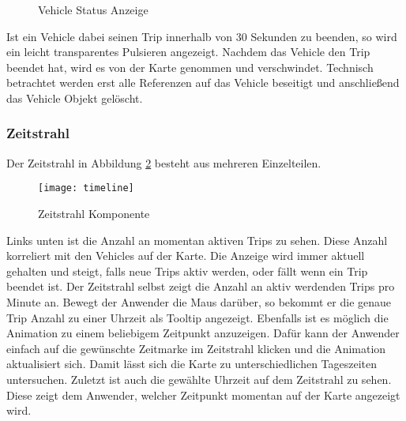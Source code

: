       \begin{figure}[htbp]
        \centering
        \hfill
        \caption{Vehicle Status Anzeige}
        \label{fig:vehicle_states}
      \end{figure}

      
      Ist ein Vehicle dabei seinen Trip innerhalb von 30 Sekunden zu beenden, so wird ein leicht transparentes Pulsieren angezeigt. Nachdem das Vehicle den Trip beendet hat, wird es von der Karte genommen und verschwindet. Technisch betrachtet werden erst alle Referenzen auf das Vehicle beseitigt und anschließend das Vehicle Objekt gelöscht.
      

    \subsubsection*{Zeitstrahl}
    \label{ssub:zeitstrahl}
      Der Zeitstrahl in Abbildung \ref{fig:timeline} besteht aus mehreren Einzelteilen. 

      \begin{figure}[htbp]
        \begin{center}
          \texttt{[image: timeline]}
          \caption{Zeitstrahl Komponente}
          \label{fig:timeline}
        \end{center}
      \end{figure}

      Links unten ist die Anzahl an momentan aktiven Trips zu sehen. Diese Anzahl korreliert mit den Vehicles auf der Karte. Die Anzeige wird immer aktuell gehalten und steigt, falls neue Trips aktiv werden, oder fällt wenn ein Trip beendet ist. Der Zeitstrahl selbst zeigt die Anzahl an aktiv werdenden Trips pro Minute an. Bewegt der Anwender die Maus darüber, so bekommt er die genaue Trip Anzahl zu einer Uhrzeit als Tooltip angezeigt. Ebenfalls ist es möglich die Animation zu einem beliebigem Zeitpunkt anzuzeigen. Dafür kann der Anwender einfach auf die gewünschte Zeitmarke im Zeitstrahl klicken und die Animation aktualisiert sich. Damit lässt sich die Karte zu unterschiedlichen Tageszeiten untersuchen. Zuletzt ist auch die gewählte Uhrzeit auf dem Zeitstrahl zu sehen. Diese zeigt dem Anwender, welcher Zeitpunkt momentan auf der Karte angezeigt wird.
      
